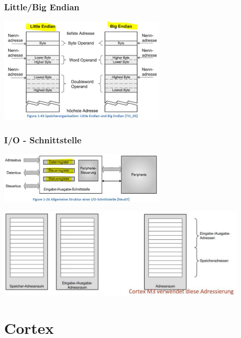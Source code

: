 \begin{multicols}{2}
\subsubsection{Little/Big Endian}
\includegraphics[width=8cm]{images/LittleBigEndian}

\subsubsection{I/O - Schnittstelle}
\includegraphics[width=8cm]{images/IOSchnittstelle}
\end{multicols}

\includegraphics[width=12cm]{images/Speicherraumadressierung}
\clearpage
\section{Cortex}
